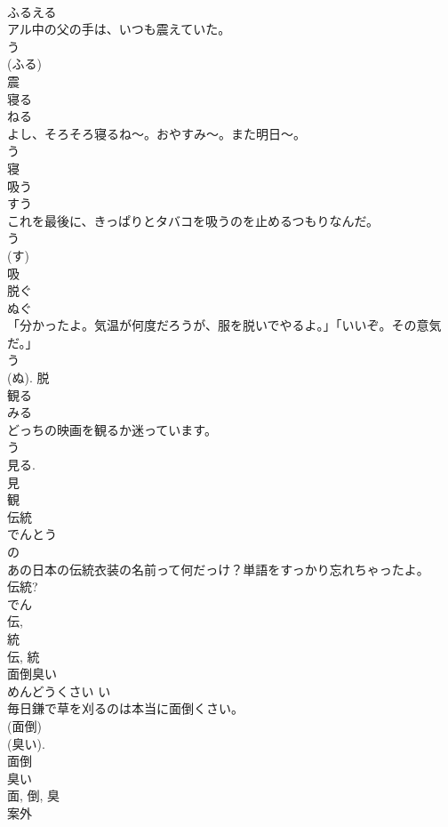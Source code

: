 \documentclass[8pt]{extreport}
\begin{document}
\begin{CJK}{UTF8}{min}
\\	ふるえる	
\\	アル中の父の手は、いつも震えていた。	
\\	う 
\\	(ふる) 
\\	震	
\\	寝る	
\\	ねる	
\\	よし、そろそろ寝るね〜。おやすみ〜。また明日〜。	
\\	う 
\\	寝	
\\	吸う	
\\	すう	
\\	これを最後に、きっぱりとタバコを吸うのを止めるつもりなんだ。	
\\	う 
\\	(す) 
\\	吸	
\\	脱ぐ	
\\	ぬぐ	
\\	「分かったよ。気温が何度だろうが、服を脱いでやるよ。」「いいぞ。その意気だ。」	
\\	う 
\\	(ぬ).	脱	
\\	観る	
\\	みる	
\\	どっちの映画を観るか迷っています。	
\\	う 
\\	見る. 
\\	見 
\\	観	
\\	伝統	
\\	でんとう	
\\	の 
\\	あの日本の伝統衣装の名前って何だっけ？単語をすっかり忘れちゃったよ。	
\\	伝統?	
\\	でん 
\\	伝, 
\\	統 
\\	伝, 統	
\\	面倒臭い	
\\	めんどうくさい	い 
\\	毎日鎌で草を刈るのは本当に面倒くさい。	
\\	(面倒) 
\\	(臭い). 
\\	面倒 
\\	臭い 
\\	面, 倒, 臭	
\\	案外	

\end{CJK}
\end{document}
